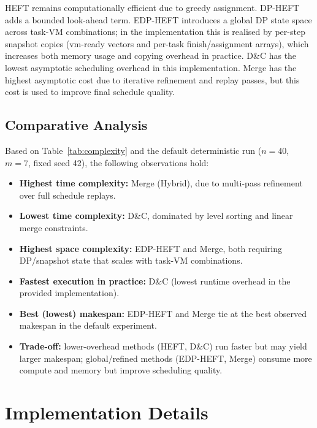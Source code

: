 \documentclass[conference]{IEEEtran}
\begin{document}
HEFT remains computationally efficient due to greedy assignment.
DP-HEFT adds a bounded look-ahead term. EDP-HEFT introduces a global
DP state space across task-VM combinations; in the implementation this
is realised by per-step snapshot copies (vm-ready vectors and per-task
finish/assignment arrays), which increases both memory usage and
copying overhead in practice. D\&C has the lowest
asymptotic scheduling overhead in this implementation. Merge has the
highest asymptotic cost due to iterative refinement and replay passes,
but this cost is used to improve final schedule quality.

\subsection{Comparative Analysis}

Based on Table~\ref{tab:complexity} and the default deterministic run
($n=40$, $m=7$, fixed seed 42), the following observations hold:
\begin{itemize}
  \item \textbf{Highest time complexity:} Merge (Hybrid), due to multi-pass
        refinement over full schedule replays.
  \item \textbf{Lowest time complexity:} D\&C, dominated by level sorting and
        linear merge constraints.
  \item \textbf{Highest space complexity:} EDP-HEFT and Merge, both requiring
        DP/snapshot state that scales with task-VM combinations.
  \item \textbf{Fastest execution in practice:} D\&C (lowest runtime overhead
        in the provided implementation).
  \item \textbf{Best (lowest) makespan:} EDP-HEFT and Merge tie at the best
        observed makespan in the default experiment.
  \item \textbf{Trade-off:} lower-overhead methods (HEFT, D\&C) run faster but
        may yield larger makespan; global/refined methods (EDP-HEFT, Merge)
        consume more compute and memory but improve scheduling quality.
\end{itemize}

\section{Implementation Details}
\label{sec:impl}
\end{document}
